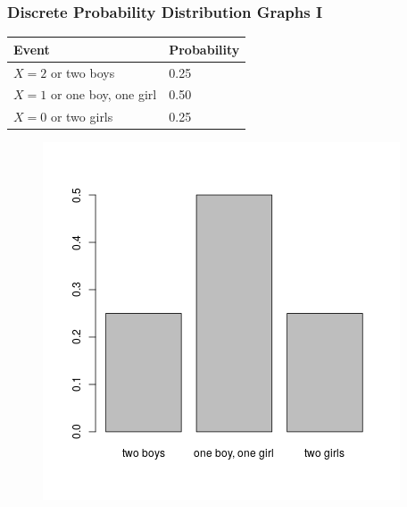 \documentclass[xcolor=dvipsnames]{beamer}
\begin{document}
\begin{frame}
  \frametitle{Discrete Probability Distribution Graphs I}
\begin{tabular}{|l|l|}\hline
  Event & Probability \\ \hline
  $X=2$ or two boys & 0.25 \\ \hline
  $X=1$ or one boy, one girl & 0.50 \\ \hline
  $X=0$ or two girls & 0.25 \\ \hline
\end{tabular}

\bigskip

\begin{figure}[h]
\includegraphics[scale=.45]{./diagrams/boys.png}
\end{figure}
\end{frame}
\end{document}
